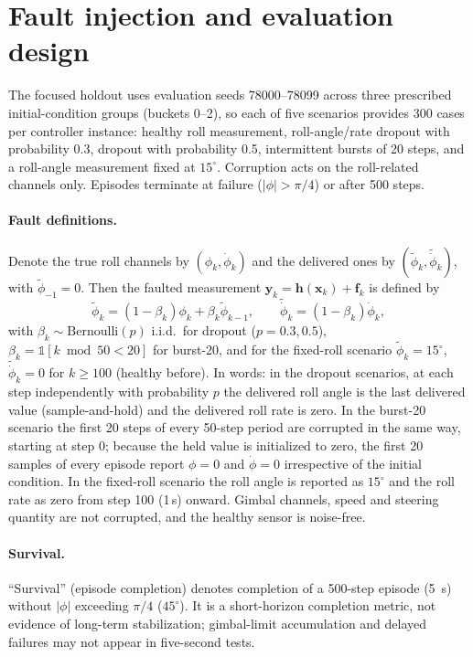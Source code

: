 \documentclass[preprint,12pt,authoryear=false]{elsarticle}
\theoremstyle{remark}\newtheorem{remark}{Remark}
\theoremstyle{plain}\newtheorem{proposition}{Proposition}\newtheorem{lemma}{Lemma}
\theoremstyle{definition}\newtheorem{assumption}{Assumption}
\begin{document}
\section{Fault injection and evaluation design}\label{sec:protocol}
The focused holdout uses evaluation seeds 78000--78099 across three prescribed initial-condition groups (buckets 0--2), so each of five scenarios provides 300 cases per controller instance: healthy roll measurement, roll-angle/rate dropout with probability 0.3, dropout with probability 0.5, intermittent bursts of 20 steps, and a roll-angle measurement fixed at $15^\circ$. Corruption acts on the roll-related channels only. Episodes terminate at failure ($|\phi|>\pi/4$) or after 500 steps.

\paragraph{Fault definitions.} Denote the true roll channels by $(\phi_k,\dot\phi_k)$ and the delivered ones by $(\tilde\phi_k,\tilde{\dot\phi}_k)$, with $\tilde\phi_{-1}=0$. Then the faulted measurement $\bm y_k=\bm h(\bm x_k)+\bm f_k$ is defined by
\begin{equation}
\tilde\phi_k=(1-\beta_k)\phi_k+\beta_k\tilde\phi_{k-1},\qquad \tilde{\dot\phi}_k=(1-\beta_k)\dot\phi_k,
\end{equation}
with $\beta_k\sim\mathrm{Bernoulli}(p)$ i.i.d.\ for dropout ($p=0.3,0.5$), $\beta_k=\mathbb 1[k\bmod 50<20]$ for burst-20, and for the fixed-roll scenario $\tilde\phi_k=15^\circ$, $\tilde{\dot\phi}_k=0$ for $k\ge100$ (healthy before). In words: in the dropout scenarios, at each step independently with probability $p$ the delivered roll angle is the last delivered value (sample-and-hold) and the delivered roll rate is zero. In the burst-20 scenario the first 20 steps of every 50-step period are corrupted in the same way, starting at step 0; because the held value is initialized to zero, the first 20 samples of every episode report $\phi=0$ and $\dot\phi=0$ irrespective of the initial condition. In the fixed-roll scenario the roll angle is reported as $15^\circ$ and the roll rate as zero from step 100 (1\,s) onward. Gimbal channels, speed and steering quantity are not corrupted, and the healthy sensor is noise-free.

\paragraph{Survival.} ``Survival'' (episode completion) denotes completion of a 500-step episode (\SI{5}{s}) without $|\phi|$ exceeding $\pi/4$ ($45^\circ$). It is a short-horizon completion metric, not evidence of long-term stabilization; gimbal-limit accumulation and delayed failures may not appear in five-second tests.
\end{document}
